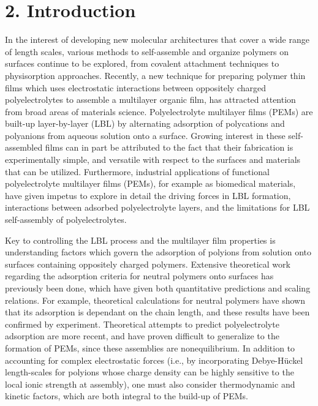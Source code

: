 \documentclass[journal=mamobx,manuscript=article]{achemso}
\begin{document}
\section{2. Introduction}

In the interest of developing new molecular architectures that cover a wide range of length scales, various methods to self-assemble and organize polymers on surfaces continue to be explored, from covalent attachment techniques\cite{doi:10.1002/ijch.199600050,B210143M,doi:10.1002/masy.200450305} to physisorption approaches.\cite{Chen1992,Serizawa2002}  Recently, a new technique for preparing polymer thin films which uses electrostatic interactions between oppositely charged polyelectrolytes to assemble a multilayer organic film, has attracted attention from broad areas of materials science.\cite{Decher1997}  Polyelectrolyte multilayer films (PEMs) are built-up layer-by-layer (LBL) by alternating adsorption of polycations and polyanions from aqueous solution onto a surface.\cite{Decher2006}  Growing interest in these self-assembled films can in part be attributed to the fact that their fabrication is experimentally simple, and versatile with respect to the surfaces and materials that can be utilized.  Furthermore, industrial applications of functional polyelectrolyte multilayer films (PEMs), for example as biomedical materials, have given impetus to explore in detail the driving forces in LBL formation, interactions between adsorbed polyelectrolyte layers, and the limitations for LBL self-assembly of polyelectrolytes.

Key to controlling the LBL process and the multilayer film properties is understanding factors which govern the adsorption of polyions from solution onto surfaces containing oppositely charged polymers.  Extensive theoretical work regarding the adsorption criteria for neutral polymers onto surfaces has previously been done, which have given both quantitative predictions\cite{Fleer1982,Baumgartner1991} and scaling relations.\cite{DeGennes1976,Alexander1977}  For example, theoretical calculations for neutral polymers have shown that its adsorption is dependant on the chain length,\cite{Stuart1980} and these results have been confirmed by experiment.\cite{Stuart1980,Felter1970}  Theoretical attempts to predict polyelectrolyte adsorption are more recent, and have proven difficult to generalize to the formation of PEMs, since these assemblies are nonequilibrium.  In addition to accounting for complex electrostatic forces (i.e., by incorporating Debye-H\"uckel length-scales for polyions whose charge density can be highly sensitive to the local ionic strength at assembly),\cite{Chatellier1996} one must also consider thermodynamic and kinetic factors, which are both integral to the build-up of PEMs.\cite{Kovacevic2002} 
\end{document}

